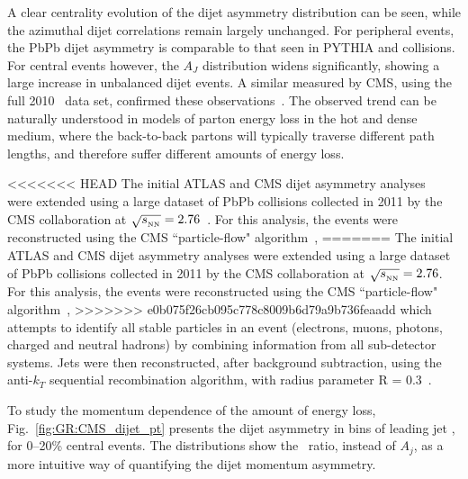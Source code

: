 A clear centrality evolution of the dijet asymmetry distribution can be seen, while the azimuthal
dijet correlations remain largely unchanged. For peripheral events, the PbPb dijet asymmetry
is comparable to that seen in PYTHIA and \pp collisions. For central events however,
the $A_J$ distribution widens significantly, showing a large increase in unbalanced
dijet events. 
A similar measured by CMS, using the full 2010 \PbPb\ data set, confirmed these 
observations~\cite{Chatrchyan:2011sx}.
The observed trend can be naturally understood in models of parton energy
loss in the hot and dense medium, where the back-to-back partons will typically traverse
different path lengths, and therefore suffer different amounts of energy loss. 

<<<<<<< HEAD
The initial ATLAS and CMS dijet asymmetry analyses~\cite{Aad:2010bu,Chatrchyan:2011sx}
 were extended using a large dataset of PbPb collisions
collected in 2011 by the CMS collaboration at $\sqrt{s_{_{\rm NN}}}=2.76$\TeV~\cite{CMS_dijet}. For this analysis, the events were 
reconstructed using the  CMS ``particle-flow" algorithm~\cite{CMS-PAS-PFT-10-002,MattPFlow}, 
=======
The initial ATLAS and CMS dijet asymmetry analyses were extended using a large dataset of PbPb collisions
collected in 2011 by the CMS collaboration at $\sqrt{s_{_{\rm NN}}}=2.76$\TeV. For this analysis, the events were
reconstructed using the  CMS ``particle-flow" algorithm~\cite{CMS-PAS-PFT-10-002,MattPFlow},
>>>>>>> e0b075f26cb095c778c8009b6d79a9b736feaadd
which attempts to identify all stable particles in an
event (electrons, muons, photons, charged and neutral hadrons)
by combining information from all sub-detector systems.
Jets were then reconstructed, after background subtraction, using the anti-$k_T$ sequential recombination algorithm,
with radius parameter R = 0.3~\cite{Cacciari:2008gp}.

To study the momentum dependence of the amount of energy loss,
Fig.~\ref{fig:GR:CMS_dijet_pt} presents the dijet asymmetry in bins of leading jet
\pT, for 0--20\% central events.
The distributions show the \ptrat\ ratio, instead of $A_j$,  as a more intuitive
way of quantifying the dijet momentum asymmetry.

